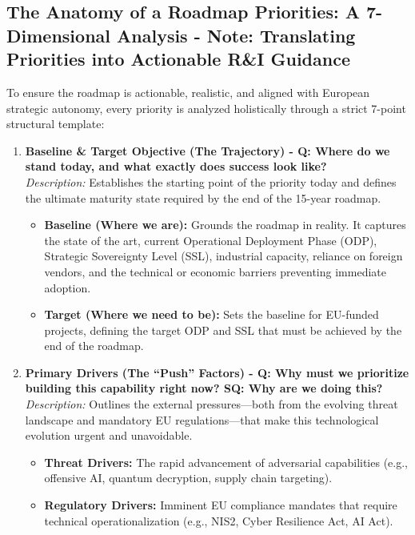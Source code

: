 \documentclass[12pt,a4paper]{article}
\begin{document}
\subsection{The Anatomy of a Roadmap Priorities: A 7-Dimensional Analysis - \textbf{Note: Translating Priorities into Actionable R\&I Guidance}}
To ensure the roadmap is actionable, realistic, and aligned with European strategic autonomy, every priority is analyzed holistically through a strict 7-point structural template:

\begin{enumerate}
    \item \textbf{Baseline \& Target Objective (The Trajectory) - Q: Where do we stand today, and what exactly does success look like?}\\
    \textit{Description:} Establishes the starting point of the priority today and defines the ultimate maturity state required by the end of the 15-year roadmap.
    \begin{itemize}
    \item \textbf{Baseline (Where we are):} Grounds the roadmap in reality. It captures the state of the art, current Operational Deployment Phase (ODP), Strategic Sovereignty Level (SSL), industrial capacity, reliance on foreign vendors, and the technical or economic barriers preventing immediate adoption.
    \item \textbf{Target (Where we need to be):} Sets the baseline for EU-funded projects, defining the target ODP and SSL that must be achieved by the end of the roadmap.
\end{itemize}
    
    \item \textbf{Primary Drivers (The ``Push''  Factors) - Q: Why must we prioritize building this capability right now? SQ: Why are we doing this?}\\
    \textit{Description:} Outlines the external pressures---both from the evolving threat landscape and mandatory EU regulations---that make this technological evolution urgent and unavoidable.
    \begin{itemize}
        \item \textbf{Threat Drivers:} The rapid advancement of adversarial capabilities (e.g., offensive AI, quantum decryption, supply chain targeting).
        \item \textbf{Regulatory Drivers:} Imminent EU compliance mandates that require technical operationalization (e.g., NIS2, Cyber Resilience Act, AI Act).
    \end{itemize}


\end{enumerate}
\end{document}
